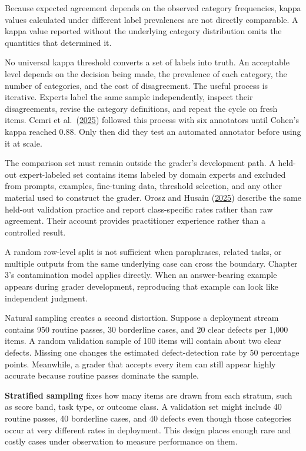 Because expected agreement depends on the observed category frequencies, kappa values calculated under different label prevalences are not directly comparable. A kappa value reported without the underlying category distribution omits the quantities that determined it.

No universal kappa threshold converts a set of labels into truth. An acceptable level depends on the decision being made, the prevalence of each category, the number of categories, and the cost of disagreement. The useful process is iterative. Experts label the same sample independently, inspect their disagreements, revise the category definitions, and repeat the cycle on fresh items. Cemri et al.~(\href{https://arxiv.org/abs/2503.13657}{2025}) followed this process with six annotators until Cohen's kappa reached 0.88. Only then did they test an automated annotator before using it at scale.

The comparison set must remain outside the grader's development path. A held-out expert-labeled set contains items labeled by domain experts and excluded from prompts, examples, fine-tuning data, threshold selection, and any other material used to construct the grader. Orosz and Husain (\href{https://newsletter.pragmaticengineer.com/p/evals}{2025}) describe the same held-out validation practice and report class-specific rates rather than raw agreement. Their account provides practitioner experience rather than a controlled result.

A random row-level split is not sufficient when paraphrases, related tasks, or multiple outputs from the same underlying case can cross the boundary. Chapter 3's contamination model applies directly. When an answer-bearing example appears during grader development, reproducing that example can look like independent judgment.

Natural sampling creates a second distortion. Suppose a deployment stream contains 950 routine passes, 30 borderline cases, and 20 clear defects per 1,000 items. A random validation sample of 100 items will contain about two clear defects. Missing one changes the estimated defect-detection rate by 50 percentage points. Meanwhile, a grader that accepts every item can still appear highly accurate because routine passes dominate the sample.

\textbf{Stratified sampling} fixes how many items are drawn from each stratum, such as score band, task type, or outcome class. A validation set might include 40 routine passes, 40 borderline cases, and 40 defects even though those categories occur at very different rates in deployment. This design places enough rare and costly cases under observation to measure performance on them.

